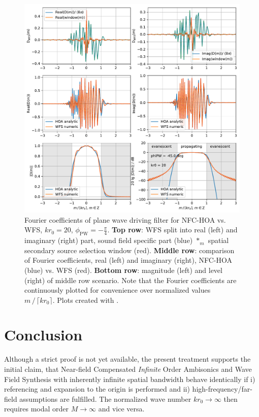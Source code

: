 \documentclass[a4paper, 10pt, twocolumn]{article}
\begin{document}
\begin{figure}
\includegraphics[width=\textwidth]{nfc_hoa_vs_WFS_drivingfunctions_plot_PW_kr20.pdf}
\caption{Fourier coefficients of plane wave driving filter for NFC-HOA vs. WFS, $kr_0=20$, $\phi_\text{PW}=-\frac{\pi}{4}$.
\textbf{Top row}: WFS split into real (left) and imaginary (right) part, sound field specific part (blue) $*_m$ spatial secondary source selection window (red).
\textbf{Middle row}: comparison of Fourier coefficients, real (left) and imaginary (right), NFC-HOA (blue) vs. WFS (red).
\textbf{Bottom row}: magnitude (left) and level (right) of middle row scenario.
Note that the Fourier coefficients are continuously plotted for convenience over normalized values $m \, / \, \lceil k r_0 \rceil$.
Plots created with \cite[\texttt{nfc\_hoa\_vs\_WFS\_drivingfunctions\_PW.py}]{Schultz2019}.}
\label{fig:kr20}
\end{figure}








\section*{Conclusion}
\label{sec:Conclusion}
\noindent\hspace*{2mm} Although a strict proof is not yet available, the present treatment supports
the initial claim, that Near-field Compensated \textit{Infinite} Order Ambisonics
and Wave Field Synthesis with inherently infinite spatial bandwidth  
behave identically if i) referencing and expansion to the origin
is performed and ii) high-frequency/far-field assumptions are fulfilled.
The normalized wave number $k r_0 \rightarrow \infty$ then requires modal order $M\rightarrow \infty$
and vice versa.
\end{document}
